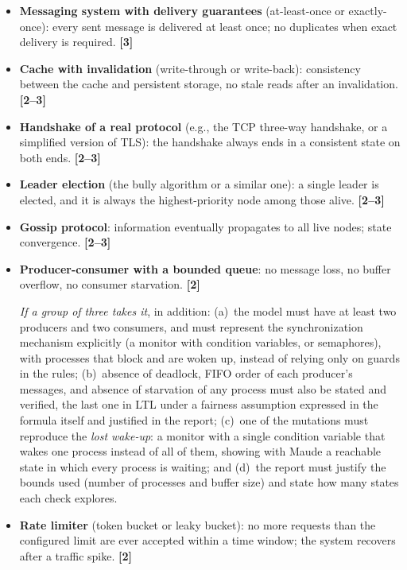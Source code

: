 \begin{listaejercicios}
\begin{itemize}
\item
\textbf{Messaging system with delivery guarantees} (at-least-once or
exactly-once): every sent message is delivered at least once; no
duplicates when exact delivery is required. \textbf{[3]}

\item
\textbf{Cache with invalidation} (write-through or write-back): consistency
between the cache and persistent storage, no stale reads after an
invalidation. \textbf{[2--3]}

\item
\textbf{Handshake of a real protocol} (e.g., the TCP three-way handshake, or
a simplified version of TLS): the handshake always ends in a consistent
state on both ends. \textbf{[2--3]}

\item
\textbf{Leader election} (the bully algorithm or a similar one): a single
leader is elected, and it is always the highest-priority node among those
alive. \textbf{[2--3]}

\item
\textbf{Gossip protocol}: information eventually propagates to all live
nodes; state convergence. \textbf{[2--3]}

\item
\textbf{Producer-consumer with a bounded queue}: no message loss, no buffer
overflow, no consumer starvation. \textbf{[2]}

\emph{If a group of three takes it}, in addition:
(a)~the model must have at least two producers and two consumers, and must
represent the synchronization mechanism explicitly (a monitor with condition
variables, or semaphores), with processes that block and are woken up,
instead of relying only on guards in the rules;
(b)~absence of deadlock, FIFO order of each producer's messages, and absence
of starvation of any process must also be stated and verified, the last one
in LTL under a fairness assumption expressed in the formula itself and
justified in the report;
(c)~one of the mutations must reproduce the \emph{lost wake-up}: a monitor
with a single condition variable that wakes one process instead of all of
them, showing with Maude a reachable state in which every process is
waiting; and
(d)~the report must justify the bounds used (number of processes and buffer
size) and state how many states each check explores.

\item
\textbf{Rate limiter} (token bucket or leaky bucket): no more requests than
the configured limit are ever accepted within a time window; the system
recovers after a traffic spike. \textbf{[2]}


\end{itemize}
\end{listaejercicios}
